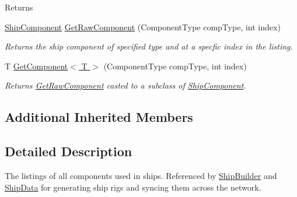 \begin{DoxyCompactItemize}
\begin{DoxyCompactList}
\begin{DoxyReturn}{Returns}
\end{DoxyReturn}
 \end{DoxyCompactList}\item 
\hyperlink{class_skyrates_1_1_client_1_1_ship_1_1_ship_component}{Ship\-Component} \hyperlink{class_skyrates_1_1_client_1_1_ship_1_1_ship_component_list_ab35ea6fc57223b90c9acd8ec338eeedd}{Get\-Raw\-Component} (Component\-Type comp\-Type, int index)
\begin{DoxyCompactList}\small\item\em Returns the ship component of specified type and at a specfic index in the listing. \end{DoxyCompactList}\item 
T \hyperlink{class_skyrates_1_1_client_1_1_ship_1_1_ship_component_list_a090584d5c90d9a0423414a25d26c0a65}{Get\-Component$<$ T $>$} (Component\-Type comp\-Type, int index)
\begin{DoxyCompactList}\small\item\em Returns \hyperlink{class_skyrates_1_1_client_1_1_ship_1_1_ship_component_list_ab35ea6fc57223b90c9acd8ec338eeedd}{Get\-Raw\-Component} casted to a subclass of \hyperlink{class_skyrates_1_1_client_1_1_ship_1_1_ship_component}{Ship\-Component}. \end{DoxyCompactList}\end{DoxyCompactItemize}
\subsection*{Additional Inherited Members}


\subsection{Detailed Description}
The listings of all components used in ships. Referenced by \hyperlink{class_skyrates_1_1_client_1_1_ship_1_1_ship_builder}{Ship\-Builder} and \hyperlink{class_ship_data}{Ship\-Data} for generating ship rigs and syncing them across the network. 



